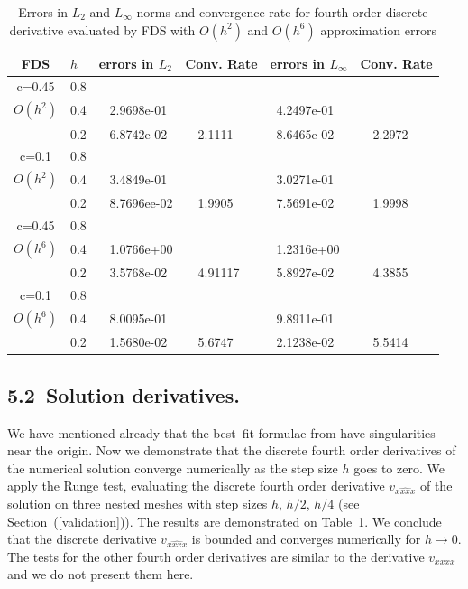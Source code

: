\documentclass{article}
\newcommand{\rf}[1]{(\ref{#1})}
\begin{document}
 \begin{center}
\begin{table}[ht]
\centering
		\begin{tabular}{||c|l|ll|ll||}
			\hline
			\hline
      FDS       & $h$ &errors in $L_2$&Conv. Rate& errors in $L_\infty$&Conv. Rate\\
   			\hline 
					\hline 
      c=0.45    &0.8    &             &            &           &   \\
   $O(h^2)$     &0.4    &~ 2.9698e-01  &            &~4.2497e-01 &   \\
                &0.2   &~ 6.8742e-02  &~~2.1111  &~8.6465e-02 &~~2.2972 \\
               	 \hline 
     c=0.1      &0.8   &             &           &                & \\
     $O(h^2)$   &0.4   &~ 3.4849e-01  &             &~3.0271e-01      &    \\
                &0.2  &~ 8.7696ee-02 &~~1.9905       &~7.5691e-02      &~~1.9998  \\
			\hline
			\hline 	
      c=0.45    &0.8   &            &            &             &    \\
       $O(h^6)$ &0.4   &~ 1.0766e+00   &           &~1.2316e+00  &   \\
                &0.2  &~ 3.5768e-02 &~~4.91117    &~5.8927e-02  &~~4.3855  \\
					  			\hline 	
     c=0.1      &0.8  &            &               &               &     \\
     $O(h^6)$  &0.4   &~ 8.0095e-01  &              &~9.8911e-01      &        \\
               &0.2  &~ 1.5680e-02&~~5.6747        &~2.1238e-02 &~~5.5414       \\
		   \hline
			\hline 
		\end{tabular}
		\caption{Errors  in $L_2$ and $L_\infty$ norms and  convergence  rate for  fourth order discrete derivative  evaluated by FDS with $O(h^2)$ and $O(h^6)$ approximation errors}
\label{tab:fourth-der}
\end{table}
\end{center}

\subsection{5.2~Solution derivatives.}

We have mentioned already that the best--fit formulae from \cite{Ch2011} have singularities near the origin. 
Now we demonstrate  that the discrete fourth order derivatives of the numerical solution converge numerically as the step size $h$ goes to zero.
We apply the Runge test, evaluating the discrete fourth order derivative $v_{\widehat{xxxx}}$ of the solution on three nested meshes with step sizes $h$, $h/2$, $h/4$ (see Section~\rf{validation}).  The results are demonstrated on Table~\ref{tab:fourth-der}.  
We conclude that the discrete  derivative $v_{\widehat{xxxx}}$ is bounded and converges numerically for $h\rightarrow 0$. The tests for the other fourth order derivatives are similar to the derivative $v_{xxxx}$ and we do not present them here.
\end{document}

